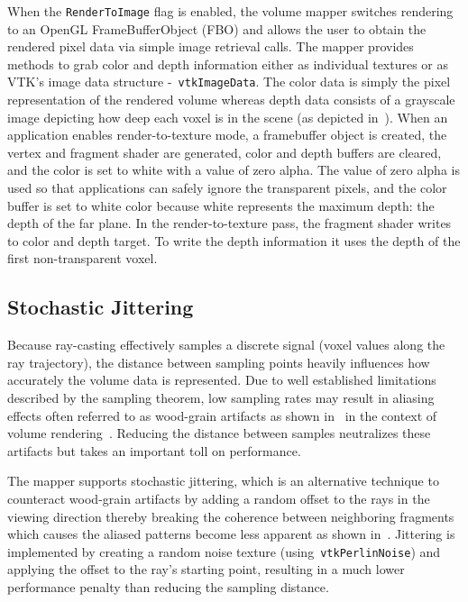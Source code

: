 When the \texttt{RenderToImage} flag is enabled, the volume mapper switches
rendering to an OpenGL FrameBufferObject (FBO) and allows the user to obtain the
rendered pixel data via simple image retrieval calls. The mapper provides
methods to grab color and depth information either as individual textures or as
VTK's image data structure -~\texttt{vtkImageData}. The color data is simply the
pixel representation of the rendered volume whereas depth data consists of a
grayscale image depicting how deep each voxel is in the scene (as depicted
in~). When an application enables render-to-texture
mode, a framebuffer object is created, the vertex and fragment shader are
generated, color and depth buffers are cleared, and the color is set to white
with a value of zero alpha. The value of zero alpha is used so that applications
can safely ignore the transparent pixels, and the color buffer is set to white
color because white represents the maximum depth: the depth of the far
plane. In the render-to-texture pass, the fragment shader writes to color and
depth target. To write the depth information it uses the depth of the first
non-transparent voxel.

\subsection{Stochastic Jittering}
\label{jittering}
Because ray-casting effectively samples a discrete signal (voxel values along
the ray trajectory), the distance between sampling points heavily influences how
accurately the volume data is represented.  Due to well established limitations
described by the sampling theorem, low sampling rates may result in aliasing
effects often referred to as wood-grain artifacts as shown
in~ in the context of volume
rendering~\citep{engel_real-time_2006}. Reducing the distance between samples
neutralizes these artifacts but takes an important toll on performance.

The mapper supports stochastic jittering, which is an alternative technique to
counteract wood-grain artifacts by adding a random offset to the rays in the
viewing direction thereby breaking the coherence between neighboring fragments
which causes the aliased patterns become less apparent as shown
in~.  Jittering is implemented by creating a random
noise texture (using~\texttt{vtkPerlinNoise}) and applying the offset to the
ray's starting point, resulting in a much lower performance penalty than reducing
the sampling distance.


